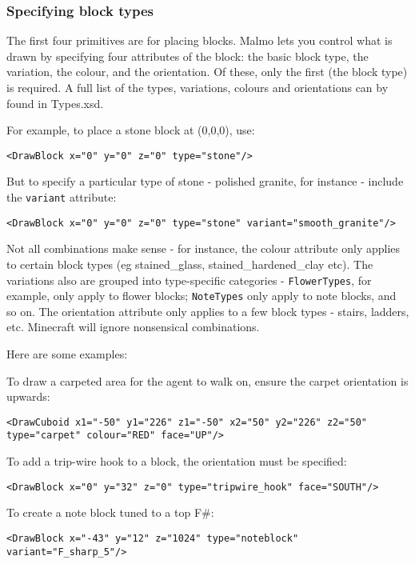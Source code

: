 \documentclass[11pt]{article} %
\begin{document}
\subsubsection{Specifying block types}

The first four primitives are for placing blocks. Malmo lets you control what is drawn by specifying four attributes of the block: the basic block type, the variation, the colour, and the orientation. Of these, only the first (the block type) is required. A full list of the types, variations, colours and orientations can by found in Types.xsd.

For example, to place a stone block at (0,0,0), use:

\begin{lstlisting}[frame=lines]
<DrawBlock x="0" y="0" z="0" type="stone"/>
\end{lstlisting}

But to specify a particular type of stone - polished granite, for instance - include the \lstinline!variant! attribute:

\begin{lstlisting}[frame=lines]
<DrawBlock x="0" y="0" z="0" type="stone" variant="smooth_granite"/>
\end{lstlisting}

Not all combinations make sense - for instance, the colour attribute only applies to certain block types (eg stained\_glass, stained\_hardened\_clay etc). The variations also are grouped into type-specific categories - \lstinline!FlowerTypes!, for example, only apply to flower blocks; \lstinline!NoteTypes! only apply to note blocks, and so on. The orientation attribute only applies to a few block types - stairs, ladders, etc. Minecraft will ignore nonsensical combinations.

Here are some examples:

To draw a carpeted area for the agent to walk on, ensure the carpet orientation is upwards:
\begin{lstlisting}[frame=lines]
<DrawCuboid x1="-50" y1="226" z1="-50" x2="50" y2="226" z2="50" type="carpet" colour="RED" face="UP"/>
\end{lstlisting}

To add a trip-wire hook to a block, the orientation must be specified:
\begin{lstlisting}[frame=lines]
<DrawBlock x="0" y="32" z="0" type="tripwire_hook" face="SOUTH"/>
\end{lstlisting}

To create a note block tuned to a top F\#:
\begin{lstlisting}[frame=lines]
<DrawBlock x="-43" y="12" z="1024" type="noteblock" variant="F_sharp_5"/>
\end{lstlisting}
\end{document}
